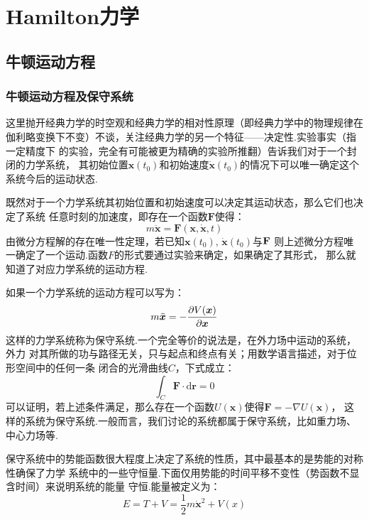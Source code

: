 \chapter{Hamilton力学}
    \section{牛顿运动方程}
    \subsection{牛顿运动方程及保守系统}
    \par
    这里抛开经典力学的时空观和经典力学的相对性原理（即经典力学中的物理规律在
    伽利略变换下不变）不谈，关注经典力学的另一个特征——决定性.实验事实（指一定精度下
    的实验，完全有可能被更为精确的实验所推翻）告诉我们对于一个封闭的力学系统，
    其初始位置$\bm{x}(t_0)$和初始速度$\dot{\bm{x}}(t_0)$的情况下可以唯一确定这个
    系统今后的运动状态.
    \par 既然对于一个力学系统其初始位置和初始速度可以决定其运动状态，那么它们也决定了系统
    任意时刻的加速度，即存在一个函数$\bm{F}$使得：
    \begin{equation}
        m\ddot{\bm{x}} = \bm{F}(\bm{x}, \dot{\bm{x}}, t)
    \end{equation}
    由微分方程解的存在唯一性定理，若已知$\bm{x}(t_0),\, \dot{\bm{x}}(t_0)$与$\mathbf{F}$
    则上述微分方程唯一确定了一个运动.函数$F$的形式要通过实验来确定，如果确定了其形式，
    那么就知道了对应力学系统的运动方程.
    \par 如果一个力学系统的运动方程可以写为：
    \begin{equation}
        m\ddot{\bm{x}} = -\frac{\partial{V(\bm{x})}}{\partial{\bm{x}}}
    \end{equation}
    这样的力学系统称为保守系统.一个完全等价的说法是，在外力场中运动的系统，外力
    对其所做的功与路径无关，只与起点和终点有关；用数学语言描述，对于位形空间中的任何一条
    闭合的光滑曲线$C$，下式成立：
    \begin{equation}
        \int_{C}\bm{F}\cdot\mathrm{d} \bm{r} = 0
    \end{equation}
    可以证明，若上述条件满足，那么存在一个函数$U(\bm{x})$使得$\bm{F} = -\nabla U(\bm{x})$，
    这样的系统为保守系统.一般而言，我们讨论的系统都属于保守系统，比如重力场、中心力场等.
    \par 
    保守系统中的势能函数很大程度上决定了系统的性质，其中最基本的是势能的对称性确保了力学
    系统中的一些守恒量.下面仅用势能的时间平移不变性（势函数不显含时间）来说明系统的能量
    守恒.能量被定义为：
    \begin{equation}
        E = T + V = \frac{1}{2}m\dot{\bm{x}}^2 + V(x)
    \end{equation}
